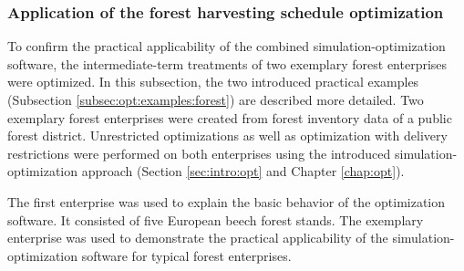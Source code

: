 \subsubsection{Application of the forest harvesting schedule optimization}
\label{subsubsec:discussion:struct:opt:application}
To confirm the practical applicability of the combined si\-mu\-la\-tion-op\-ti\-mi\-za\-tion software, the inter\-mediate-term treatments of two exemplary forest enterprises were optimized. In this subsection, the two introduced practical examples (Subsection \ref{subsec:opt:examples:forest}) are described more detailed. Two exemplary forest enterprises were created from forest inventory data of a public forest district. Unrestricted optimizations as well as optimization with delivery restrictions were performed on both enterprises using the introduced si\-mu\-la\-tion-op\-ti\-mi\-za\-tion approach (Section \ref{sec:intro:opt} and Chapter \ref{chap:opt}).

The first enterprise was used to explain the basic behavior of the optimization software. It consisted of five European beech forest stands. The exemplary enterprise was used to demonstrate the practical applicability of the si\-mu\-la\-tion-op\-ti\-mi\-za\-tion software for typical forest enterprises.

